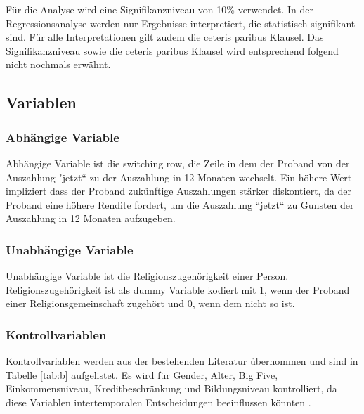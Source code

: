 \documentclass[11pt,a4paper]{article}
\begin{document}
Für die Analyse wird eine Signifikanzniveau von 10\% verwendet. In der Regressionsanalyse werden nur Ergebnisse interpretiert, die statistisch signifikant sind. Für alle Interpretationen gilt zudem die ceteris paribus Klausel. Das Signifikanzniveau sowie die ceteris paribus Klausel wird entsprechend folgend nicht nochmals erwähnt.

\subsection{Variablen}
\subsubsection{Abhängige Variable}
Abhängige Variable ist die switching row, die Zeile in dem der Proband von der Auszahlung "jetzt“ zu der Auszahlung in 12 Monaten wechselt. Ein höhere Wert impliziert dass der Proband zukünftige Auszahlungen stärker diskontiert, da der Proband eine höhere Rendite fordert, um die Auszahlung “jetzt“ zu Gunsten der Auszahlung in 12 Monaten aufzugeben. 
 

\subsubsection{Unabhängige Variable}
Unabhängige Variable ist die Religionszugehörigkeit einer Person. Religionszugehörigkeit ist als dummy Variable kodiert mit 1, wenn der Proband einer Religionsgemeinschaft zugehört und 0, wenn dem nicht so ist.  


\subsubsection{Kontrollvariablen}
Kontrollvariablen werden aus der bestehenden Literatur übernommen und sind in Tabelle \ref{tab:b} aufgelistet. Es wird für Gender, Alter, Big Five, Einkommensniveau, Kreditbeschränkung und Bildungsniveau kontrolliert, da diese Variablen intertemporalen Entscheidungen beeinflussen könnten \textcite{dohmen2012interpreting,carter2012religious}.  \\
\end{document}

